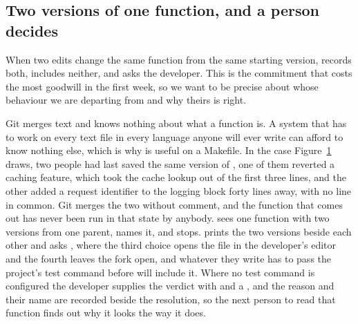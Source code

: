 \subsection{Two versions of one function, and a person decides}
\label{sec:fork}

\begin{figure}[t]
  \centering
  
  \Description{\FigForkDescription}
  \caption{\FigForkCaption}
  \label{fig:fork}
\end{figure}

When two edits change the same function from the same starting version, \sgt{}
records both, includes neither, and asks the developer. This is the commitment that
costs the most goodwill in the first week, so we want to be precise about whose
behaviour we are departing from and why theirs is right.

Git merges text and knows nothing about what a function is. A system that has
to work on every text file in every language anyone will ever write can afford to
know nothing else, which is why  is useful on a Makefile. In the case
Figure~\ref{fig:fork} draws, two people had last saved the same version of
, one of them reverted a caching feature, which took the cache
lookup out of the first three lines, and the other added a request identifier to the
logging block forty lines away, with no line in common. Git merges the two without
comment, and the function that comes out has never been run in that state by
anybody. \sgt{} sees one function with two versions from one parent, names it, and
stops.  prints the two versions beside each other
and asks , where the third choice opens
the file in the developer's editor and the fourth leaves the fork open, and whatever
they write has to pass the project's test command before \sgt{} will include it.
Where no test command is configured the developer supplies the verdict with
 and a , and the reason and their name are
recorded beside the resolution, so the next person to read that function finds out
why it looks the way it does.

